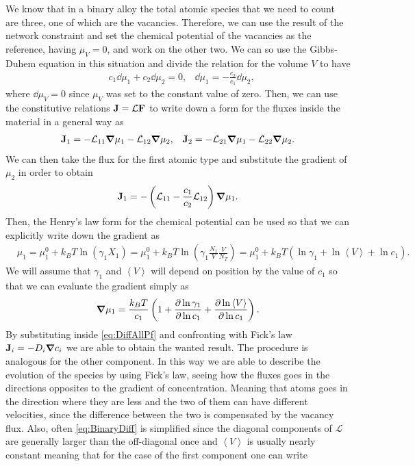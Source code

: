 {
    We know that in a binary alloy the total atomic species that we need to count are three, one of which are the vacancies. Therefore, we can use the result of the network constraint and set the chemical potential of the vacancies as the reference, having $\mu_V = 0$, and work on the other two. We can so use the Gibbs-Duhem equation in this situation and divide the relation for the volume $V$ to have
    \begin{align}
        &c_1\dd \mu_1 + c_2 \dd\mu_2 = 0, &\dd \mu_1 = -\frac{c_2}{c_1}\dd \mu_2,
    \end{align}
    where $\dd \mu_V = 0$ since $\mu_V$ was set to the constant value of zero. Then, we can use the constitutive relations $\vb{J} = \mathcal{L}\vb{F}$ to write down a form for the fluxes inside the material in a general way as
    \begin{align}
        &\vb{J}_1 = -\mathcal{L}_{11} \grad \mu_1 - \mathcal{L}_{12} \grad \mu_2,
        &\vb{J}_2 = -\mathcal{L}_{21} \grad \mu_1 - \mathcal{L}_{22} \grad \mu_2.
    \end{align}
    We can then take the flux for the first atomic type and substitute the gradient of $\mu_2$ in order to obtain
    \begin{equation}
        \label{eq:DiffAllPf}
        \vb{J}_1 = -\left( \mathcal{L}_{11} - \frac{c_1}{c_2}\mathcal{L}_{12} \right)\grad \mu_1.
    \end{equation}
    Then, the Henry's law form for the chemical potential can be used so that we can explicitly write down the gradient as
    \begin{align}
        &\mu_1 = \mu_1^0 + k_B T \ln\left( \gamma_1X_1 \right) = \mu_1^0 + k_B T \ln\left( \gamma_1\frac{N_1}{V}\frac{V}{N_T} \right) = \mu_1^0 + k_BT\left( \ln\gamma_1 + \ln\left\langle V \right\rangle + \ln c_1 \right).
    \end{align}
    We will assume that $\gamma_1$ and $\left\langle V \right\rangle$ will depend on position by the value of $c_1$ so that we can evaluate the gradient simply as
    \begin{equation}
        \grad \mu_1 = \frac{k_BT}{c_1}\left( 1 + \pdv{\ln\gamma_1}{\ln c_1} + \pdv{\ln\left\langle V \right\rangle}{\ln c_1} \right).
    \end{equation}
    By substituting inside \eqref{eq:DiffAllPf} and confronting with Fick's law $\vb{J}_i = -D_i \grad c_i$ we are able to obtain the wanted result. The procedure is analogous for the other component.
}
\noindent
In this way we are able to describe the evolution of the species by using Fick's law, seeing how the fluxes goes in the directions opposites to the gradient of concentration. Meaning that atoms goes in the direction where they are less and the two of them can have different velocities, since the difference between the two is compensated by the vacancy flux. Also, often \eqref{eq:BinaryDiff} is simplified since the diagonal components of $\mathcal{L}$ are generally larger than the off-diagonal once and $\left\langle V \right\rangle$ is usually nearly constant meaning that for the case of the first component one can write 
